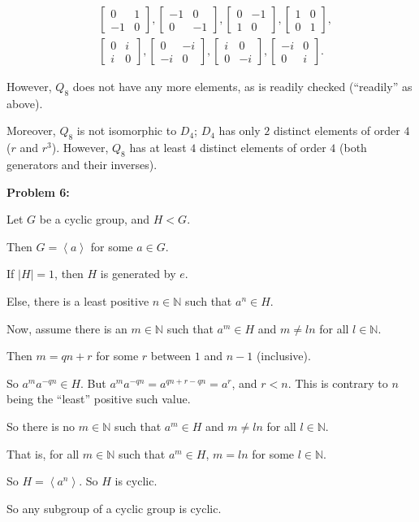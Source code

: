 \documentclass[a4paper,12pt]{article}
\newcommand{\tab}{\hspace{4mm}} %
\newcommand{\shunt}{\vspace{20mm}}
\newcommand{\absval}[1]{\lvert #1 \rvert}
\newcommand{\anbrack}[1]{\left\langle #1 \right\rangle}
\newcommand{\N}{\mathbb{N}}
\begin{document}
\begin{align*}
&\left[\begin{smallmatrix}0&1\\ -1&0 \end{smallmatrix}\right],
\left[\begin{smallmatrix}-1&0\\ 0&-1 \end{smallmatrix}\right],
\left[\begin{smallmatrix}0&-1\\ 1&0 \end{smallmatrix}\right],
\left[\begin{smallmatrix}1&0\\ 0&1 \end{smallmatrix}\right],\\
&\left[\begin{smallmatrix}0&i\\ i&0 \end{smallmatrix}\right],
\left[\begin{smallmatrix}0&-i\\ -i&0 \end{smallmatrix}\right],
\left[\begin{smallmatrix}i&0\\0&-i \end{smallmatrix}\right],
\left[\begin{smallmatrix}-i&0\\0&i \end{smallmatrix}\right].
\end{align*}

However, $Q_8$ does not have any more elements, as is readily checked (``readily'' as above).

Moreover, $Q_8$ is not isomorphic to $D_4$; $D_4$ has only $2$ distinct elements of order $4$ ($r$ and $r^3$). However, $Q_8$ has at least $4$ distinct elements of order $4$ (both generators and their inverses).

\shunt

{\bf Problem 6:}

Let $G$ be a cyclic group, and $H < G$.

Then $G = \left\langle a \right\rangle$ for some $a \in G$.

If $\absval{H} =1$, then $H$ is generated by $e$.

Else, there is a least positive $n \in \N$ such that $a^n \in H$.

Now, assume there is an $m \in \N$ such that $a^m \in H$ and $m \neq ln$ for all $l \in \N$.

\tab Then $m = qn + r$ for some $r$ between $1$ and $n-1$ (inclusive).

\tab So $a^ma^{-qn} \in H$. But $a^ma^{-qn} = a^{qn+r-qn} = a^r$, and $r<n$. This is contrary to $n$ being the ``least'' positive such value.

So there is no $m \in \N$ such that $a^m \in H$ and $m \neq ln$ for all $l \in \N$.

That is, for all $m \in \N$ such that $a^m \in H$, $m = ln$ for some $l \in \N$.

So $H = \anbrack{a^n}$. So $H$ is cyclic.

So any subgroup of a cyclic group is cyclic.

\shunt
\end{document}
